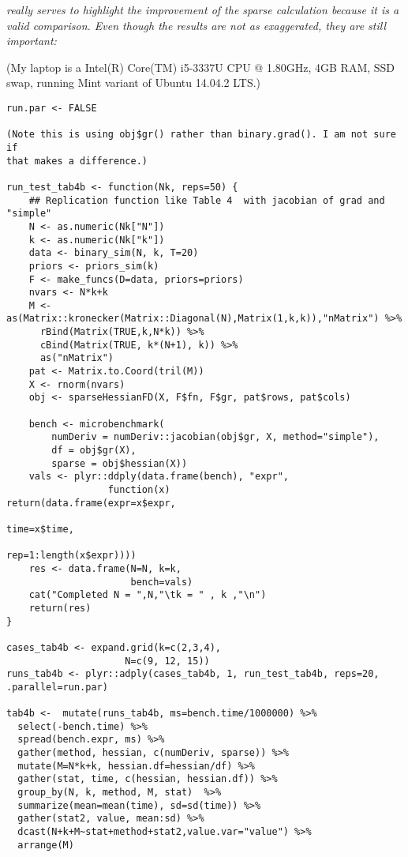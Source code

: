 \documentclass{article}
\newenvironment{revQuote}{\itshape}{\vspace{\baselineskip}}
\begin{document}
\begin{enumerate}
\begin{revQuote}
really serves to highlight the improvement of the sparse calculation because
it is a valid comparison. Even though the results are not as exaggerated,
they are still important:

(My laptop is a  Intel(R) Core(TM) i5-3337U CPU @ 1.80GHz,  4GB RAM, SSD
swap, running Mint variant of Ubuntu 14.04.2 LTS.)

\begin{verbatim}
run.par <- FALSE

(Note this is using obj$gr() rather than binary.grad(). I am not sure if
that makes a difference.)

run_test_tab4b <- function(Nk, reps=50) {
    ## Replication function like Table 4  with jacobian of grad and
"simple"
    N <- as.numeric(Nk["N"])
    k <- as.numeric(Nk["k"])
    data <- binary_sim(N, k, T=20)
    priors <- priors_sim(k)
    F <- make_funcs(D=data, priors=priors)
    nvars <- N*k+k
    M <-
as(Matrix::kronecker(Matrix::Diagonal(N),Matrix(1,k,k)),"nMatrix") %>%
      rBind(Matrix(TRUE,k,N*k)) %>%
      cBind(Matrix(TRUE, k*(N+1), k)) %>%
      as("nMatrix")
    pat <- Matrix.to.Coord(tril(M))
    X <- rnorm(nvars)
    obj <- sparseHessianFD(X, F$fn, F$gr, pat$rows, pat$cols)

    bench <- microbenchmark(
        numDeriv = numDeriv::jacobian(obj$gr, X, method="simple"), 
        df = obj$gr(X),
        sparse = obj$hessian(X))
    vals <- plyr::ddply(data.frame(bench), "expr",
                  function(x)
return(data.frame(expr=x$expr,
                                               
time=x$time,
                                               
rep=1:length(x$expr))))
    res <- data.frame(N=N, k=k,
                      bench=vals)
    cat("Completed N = ",N,"\tk = " , k ,"\n")
    return(res)
}

cases_tab4b <- expand.grid(k=c(2,3,4),
                     N=c(9, 12, 15))
runs_tab4b <- plyr::adply(cases_tab4b, 1, run_test_tab4b, reps=20,
.parallel=run.par)

tab4b <-  mutate(runs_tab4b, ms=bench.time/1000000) %>%
  select(-bench.time) %>%
  spread(bench.expr, ms) %>%
  gather(method, hessian, c(numDeriv, sparse)) %>%
  mutate(M=N*k+k, hessian.df=hessian/df) %>%
  gather(stat, time, c(hessian, hessian.df)) %>%
  group_by(N, k, method, M, stat)  %>%
  summarize(mean=mean(time), sd=sd(time)) %>%
  gather(stat2, value, mean:sd) %>%
  dcast(N+k+M~stat+method+stat2,value.var="value") %>%
  arrange(M)


\end{verbatim}
\end{revQuote}
\end{enumerate}
\end{document}
